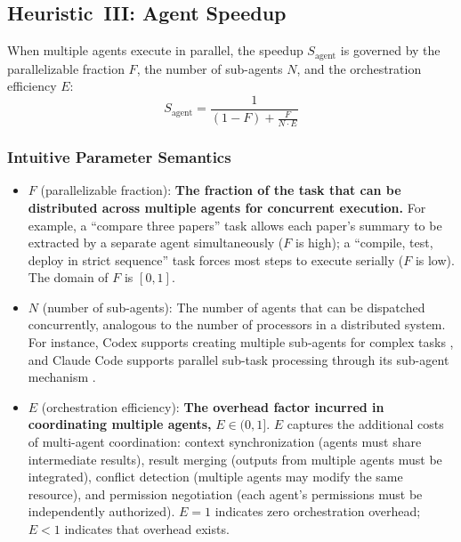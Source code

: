 \subsection{Heuristic~III: Agent Speedup}
\label{sec:law3}

\begin{heuristic}
When multiple agents execute in parallel, the speedup $S_{\mathrm{agent}}$ is governed by the parallelizable fraction $F$, the number of sub-agents $N$, and the orchestration efficiency $E$:
\begin{equation}
\label{eq:agent}
S_{\mathrm{agent}} = \frac{1}{(1-F) + \frac{F}{N \cdot E}}
\end{equation}
\end{heuristic}

\subsubsection{Intuitive Parameter Semantics}

\begin{itemize}[nosep]
\item $F$ (parallelizable fraction): \textbf{The fraction of the task that can be distributed across multiple agents for concurrent execution.} For example, a ``compare three papers'' task allows each paper's summary to be extracted by a separate agent simultaneously ($F$ is high); a ``compile, test, deploy in strict sequence'' task forces most steps to execute serially ($F$ is low). The domain of $F$ is $[0, 1]$.

\item $N$ (number of sub-agents): The number of agents that can be dispatched concurrently, analogous to the number of processors in a distributed system. For instance, Codex supports creating multiple sub-agents for complex tasks \cite{openai_codex_overview_2026}, and Claude Code supports parallel sub-task processing through its sub-agent mechanism \cite{anthropic_claudecode_subagents_2026}.

\item $E$ (orchestration efficiency): \textbf{The overhead factor incurred in coordinating multiple agents,} $E \in (0, 1]$. $E$ captures the additional costs of multi-agent coordination: context synchronization (agents must share intermediate results), result merging (outputs from multiple agents must be integrated), conflict detection (multiple agents may modify the same resource), and permission negotiation (each agent's permissions must be independently authorized). $E = 1$ indicates zero orchestration overhead; $E < 1$ indicates that overhead exists.
\end{itemize}

